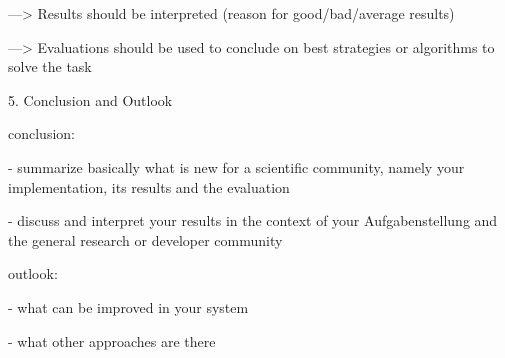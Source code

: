 ---> Results should be interpreted (reason for good/bad/average results)

---> Evaluations should be used to conclude on best strategies or algorithms to solve the task




5. Conclusion and Outlook

conclusion:

- summarize basically what is new for a scientific community, namely your implementation, its results and the evaluation

- discuss and interpret your results in the context of your Aufgabenstellung and the general research or developer community

outlook:

- what can be improved in your system

- what other approaches are there